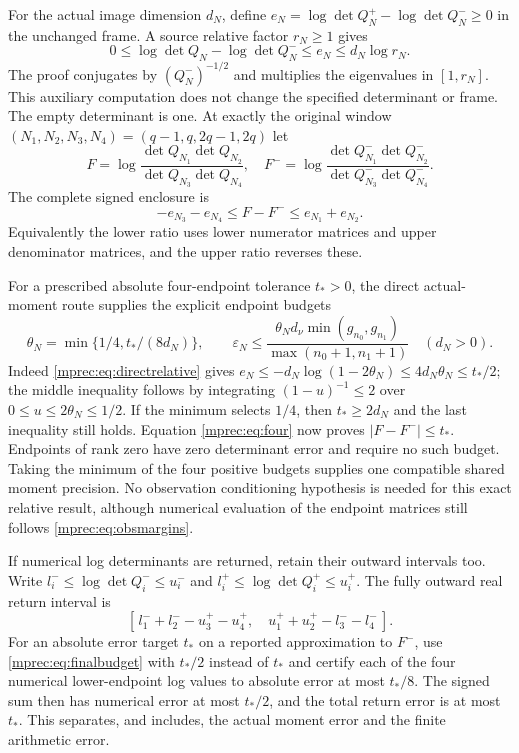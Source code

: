 For the actual image dimension $d_N$, define
$e_N=\log\det Q_N^+-\log\det Q_N^-\ge0$ in the unchanged
frame. A source relative factor $r_N\ge1$ gives
\begin{equation}\label{mprec:eq:logbound}
 0\le\log\det Q_N-\log\det Q_N^-\le e_N\le d_N\log r_N.
\end{equation}
The proof conjugates by $(Q_N^-)^{-1/2}$ and multiplies the
eigenvalues in $[1,r_N]$. This auxiliary computation does not
change the specified determinant or frame. The empty determinant
is one. At exactly the original window
$(N_1,N_2,N_3,N_4)=(q-1,q,2q-1,2q)$ let
\[
 F=\log\frac{\det Q_{N_1}\det Q_{N_2}}
                   {\det Q_{N_3}\det Q_{N_4}},\quad
 F^-=\log\frac{\det Q_{N_1}^-\det Q_{N_2}^-}
                     {\det Q_{N_3}^-\det Q_{N_4}^-}.
\]
The complete signed enclosure is
\begin{equation}\label{mprec:eq:four}
 \boxed{-e_{N_3}-e_{N_4}\le F-F^-
                         \le e_{N_1}+e_{N_2}.}
\end{equation}
Equivalently the lower ratio uses lower numerator matrices and
upper denominator matrices, and the upper ratio reverses these.

For a prescribed absolute four-endpoint tolerance $t_*>0$, the
direct actual-moment route supplies the explicit endpoint budgets
\begin{equation}\label{mprec:eq:finalbudget}
 \boxed{\theta_N=\min\{1/4,t_*/(8d_N)\},\qquad
 \varepsilon_N\le
 \frac{\theta_Nd_\nu\min(g_{n_0},g_{n_1})}
      {\max(n_0+1,n_1+1)}\quad(d_N>0).}
\end{equation}
Indeed \eqref{mprec:eq:directrelative} gives
$e_N\le-d_N\log(1-2\theta_N)\le4d_N\theta_N\le t_*/2$;
the middle inequality follows by integrating
$(1-u)^{-1}\le2$ over $0\le u\le2\theta_N\le1/2$.
If the minimum selects $1/4$, then $t_*\ge2d_N$ and the last
inequality still holds. Equation \eqref{mprec:eq:four} now proves
$|F-F^-|\le t_*$. Endpoints of rank zero have zero determinant
error and require no such budget. Taking the minimum of the four
positive budgets supplies one compatible shared moment precision.
No observation conditioning hypothesis is needed for this exact
relative result, although numerical evaluation of the endpoint
matrices still follows \eqref{mprec:eq:obsmargins}.

If numerical log determinants are returned, retain their outward
intervals too. Write $l_i^-\le\log\det Q_i^-\le u_i^-$ and
$l_i^+\le\log\det Q_i^+\le u_i^+$. The fully outward real
return interval is
\[
 [\,l_1^-+l_2^--u_3^+-u_4^+,\quad
       u_1^++u_2^+-l_3^--l_4^-\,].
\]
For an absolute error target $t_*$ on a reported approximation
to $F^-$, use \eqref{mprec:eq:finalbudget} with $t_*/2$ instead of
$t_*$ and certify each of the four numerical lower-endpoint log
values to absolute error at most $t_*/8$. The signed sum then
has numerical error at most $t_*/2$, and the total return error
is at most $t_*$. This separates, and includes, the actual moment
error and the finite arithmetic error.

